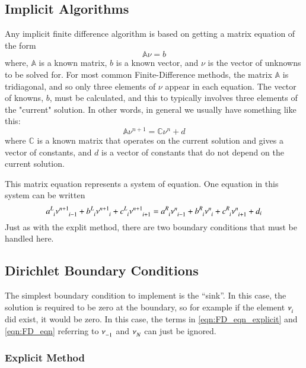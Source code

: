 \documentclass[letterpaper,12pt]{article}
\begin{document}
\subsection{Implicit Algorithms}
Any implicit finite difference algorithm is based on getting a matrix equation of the form
\begin{equation}
\mathbb{A} \nu = b
\end{equation}
where, $\mathbb{A}$ is a known matrix, $b$ is a known vector, and $\nu$ is the vector of unknowns to be solved for.
For most common Finite-Difference methods, the matrix $\mathbb{A}$ is tridiagonal, and so only three elements of $\nu$ appear in each equation. The vector of knowns, $b$, must be calculated, and this to typically involves three elements of the "current" solution. In other words, in general we usually have something like this:
\begin{equation}
  \mathbb{A} \nu^{n+1} = \mathbb{C} \nu^{n} + d
\end{equation}
where $\mathbb{C}$ is a known matrix that operates on the current solution and gives a vector of constants, and $d$ is a vector of constants that do not depend on the current solution.

This matrix equation represents a system of equation. One equation in this system can be written
\begin{equation}
  \label{eqn:FD_eqn}
  a\indices{^L_i} \nu\indices{^{n+1}_{i-1}}
+ b\indices{^L_i} \nu\indices{^{n+1}_{i  }}
+ c\indices{^L_i} \nu\indices{^{n+1}_{i+1}}
=
  a\indices{^R_i} \nu\indices{^{n  }_{i-1}}
+ b\indices{^R_i} \nu\indices{^{n  }_{i  }}
+ c\indices{^R_i} \nu\indices{^{n  }_{i+1}}
+ d_i
\end{equation}
Just as with the explit method, there are two boundary conditions that must be handled here.

\subsection{Dirichlet Boundary Conditions}
The simplest boundary condition to implement is the ``sink''. In this case, the
solution is required to be zero at the boundary, so for example if the element
$\nu\indices{_i}$ did exist, it would be zero. In this case, the terms in
\ref{eqn:FD_eqn_explicit} and \ref{eqn:FD_eqn} referring to $\nu\indices{_{-1}}$ and  $\nu\indices{_{N}}$ can
just be ignored.

\subsubsection{Explicit Method}
\end{document}
